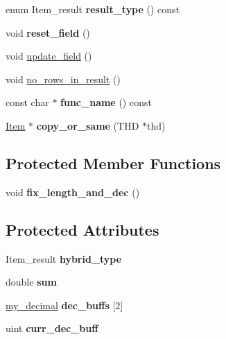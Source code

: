 \begin{DoxyCompactItemize}
enum Item\+\_\+result {\bfseries result\+\_\+type} () const
\item 
\mbox{\label{classItem__sum__sum_af3f3a717320b2d78f397f44e210fdbcf}} 
void {\bfseries reset\+\_\+field} ()
\item 
void \mbox{\hyperlink{classItem__sum__sum_a00f3c26e38463e41da4e41613d37f0bf}{update\+\_\+field}} ()
\item 
void \mbox{\hyperlink{classItem__sum__sum_aa610e5d4e5371dcea4625416d7d79d93}{no\+\_\+rows\+\_\+in\+\_\+result}} ()
\item 
\mbox{\label{classItem__sum__sum_a5c5bc8db3f7ca16d0a7be416bdeb7298}} 
const char $\ast$ {\bfseries func\+\_\+name} () const
\item 
\mbox{\label{classItem__sum__sum_a835b7b2b34b427fbf172bb20f43e08a2}} 
\mbox{\hyperlink{classItem}{Item}} $\ast$ {\bfseries copy\+\_\+or\+\_\+same} (T\+HD $\ast$thd)
\end{DoxyCompactItemize}
\subsection*{Protected Member Functions}
\begin{DoxyCompactItemize}
\item 
\mbox{\label{classItem__sum__sum_ab0fd9ec93e42a766ff0b1e4d0c43a918}} 
void {\bfseries fix\+\_\+length\+\_\+and\+\_\+dec} ()
\end{DoxyCompactItemize}
\subsection*{Protected Attributes}
\begin{DoxyCompactItemize}
\item 
\mbox{\label{classItem__sum__sum_a54c9fbf3ad3be0b16437803c6807d142}} 
Item\+\_\+result {\bfseries hybrid\+\_\+type}
\item 
\mbox{\label{classItem__sum__sum_a49c532a747ca5af46207a076c4306e9e}} 
double {\bfseries sum}
\item 
\mbox{\label{classItem__sum__sum_a7acbeba8fa55509dd5314cc3774ff558}} 
\mbox{\hyperlink{classmy__decimal}{my\+\_\+decimal}} {\bfseries dec\+\_\+buffs} \mbox{[}2\mbox{]}
\item 
\mbox{\label{classItem__sum__sum_ad92dee782418bbaae0bf258f592f3d96}} 
uint {\bfseries curr\+\_\+dec\+\_\+buff}
\end{DoxyCompactItemize}
